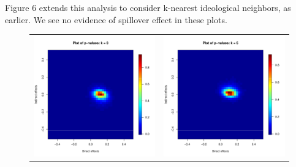 \documentclass[12pt]{article}
\begin{document}
Figure 6 extends this analysis to consider k-nearest ideological neighbors, as earlier. We see no evidence of spillover effect in these plots.
\begin{figure}
	\centering
	\begin{tabular}{cc}
	\includegraphics[scale=0.45]{./images/pvalues_figure_3nn_Bergan.pdf} &
	\includegraphics[scale=0.45]{./images/pvalues_figure_5nn_Bergan.pdf} \\ 

\end{tabular}
\end{figure}
\end{document}
